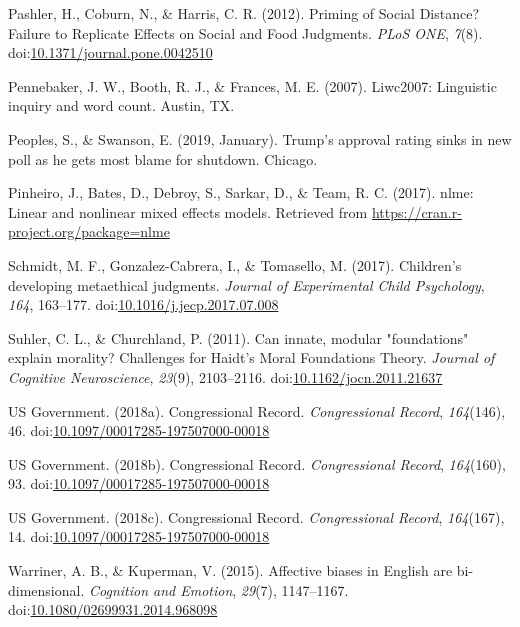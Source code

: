 \documentclass[english,,man]{apa6}
\begin{document}
\leavevmode\hypertarget{ref-Pashler2012}{}%
Pashler, H., Coburn, N., \& Harris, C. R. (2012). Priming of Social Distance? Failure to Replicate Effects on Social and Food Judgments. \emph{PLoS ONE}, \emph{7}(8). doi:\href{https://doi.org/10.1371/journal.pone.0042510}{10.1371/journal.pone.0042510}

\leavevmode\hypertarget{ref-Pennebaker2007}{}%
Pennebaker, J. W., Booth, R. J., \& Frances, M. E. (2007). Liwc2007: Linguistic inquiry and word count. Austin, TX.

\leavevmode\hypertarget{ref-Peoples2019}{}%
Peoples, S., \& Swanson, E. (2019, January). Trump's approval rating sinks in new poll as he gets most blame for shutdown. Chicago.

\leavevmode\hypertarget{ref-Pinheiro2017}{}%
Pinheiro, J., Bates, D., Debroy, S., Sarkar, D., \& Team, R. C. (2017). nlme: Linear and nonlinear mixed effects models. Retrieved from \url{https://cran.r-project.org/package=nlme}

\leavevmode\hypertarget{ref-Schmidt2017}{}%
Schmidt, M. F., Gonzalez-Cabrera, I., \& Tomasello, M. (2017). Children's developing metaethical judgments. \emph{Journal of Experimental Child Psychology}, \emph{164}, 163--177. doi:\href{https://doi.org/10.1016/j.jecp.2017.07.008}{10.1016/j.jecp.2017.07.008}

\leavevmode\hypertarget{ref-Suhler2011}{}%
Suhler, C. L., \& Churchland, P. (2011). Can innate, modular "foundations" explain morality? Challenges for Haidt's Moral Foundations Theory. \emph{Journal of Cognitive Neuroscience}, \emph{23}(9), 2103--2116. doi:\href{https://doi.org/10.1162/jocn.2011.21637}{10.1162/jocn.2011.21637}

\leavevmode\hypertarget{ref-USGovernment2018b}{}%
US Government. (2018a). Congressional Record. \emph{Congressional Record}, \emph{164}(146), 46. doi:\href{https://doi.org/10.1097/00017285-197507000-00018}{10.1097/00017285-197507000-00018}

\leavevmode\hypertarget{ref-USGovernment2018}{}%
US Government. (2018b). Congressional Record. \emph{Congressional Record}, \emph{164}(160), 93. doi:\href{https://doi.org/10.1097/00017285-197507000-00018}{10.1097/00017285-197507000-00018}

\leavevmode\hypertarget{ref-USGovernment2018a}{}%
US Government. (2018c). Congressional Record. \emph{Congressional Record}, \emph{164}(167), 14. doi:\href{https://doi.org/10.1097/00017285-197507000-00018}{10.1097/00017285-197507000-00018}

\leavevmode\hypertarget{ref-Warriner2015}{}%
Warriner, A. B., \& Kuperman, V. (2015). Affective biases in English are bi-dimensional. \emph{Cognition and Emotion}, \emph{29}(7), 1147--1167. doi:\href{https://doi.org/10.1080/02699931.2014.968098}{10.1080/02699931.2014.968098}
\end{document}
